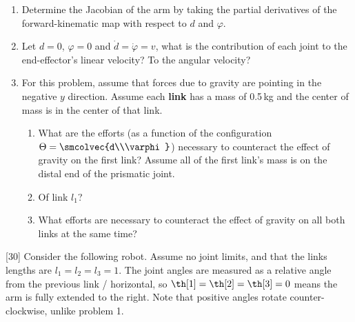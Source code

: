 \documentclass{16384_doc}
\begin{document}
\begin{questions}
\begin{enumerate} [label=\alph*.]
        \item \text{[5 points]} Determine the Jacobian of the arm by taking the partial derivatives of the forward-kinematic map with respect to $d$ and $\varphi$.
        \begin{tcolorbox}[height=3cm]
        \end{tcolorbox}

        \item \text{[5 points]} Let $d = 0$, $\varphi = 0$ and $\dot{d} = \dot{\varphi} = v$, what is the contribution of each joint to the end-effector's linear velocity? To the angular velocity?
        \begin{tcolorbox}[height=3cm]
        \end{tcolorbox}

        \item \text{[5 points]} For this problem, assume that forces due to gravity are
        pointing in the negative $y$ direction. Assume each \textbf{link} has a mass of
        0.5\,kg and the center of mass is in the center of that link.
        \begin{enumerate} [label=(\roman*)]
        \item What are the efforts
        (as a function of the configuration $\Theta=\smcolvec{d\\\varphi}$) necessary to counteract the effect
        of gravity on the first link? Assume all of the first link's mass is on the distal end of the prismatic joint.
        \item Of link $l_1$?
        \item What efforts are necessary to counteract the effect of gravity on all both links at the same time?
        \end{enumerate}
        \begin{tcolorbox}[height=3cm]
        \end{tcolorbox}

    \end{enumerate}

    \pagebreak
    [30]
    Consider the following robot. Assume no joint limits, and that the links lengths are $l_1=l_2=l_3=1$. The joint angles are measured as a relative angle from the previous link / horizontal, so $\th[1]=\th[2]=\th[3]=0$ means the arm is fully extended to the right. Note that positive angles rotate counter-clockwise, unlike problem 1.


\end{questions}
\end{document}
